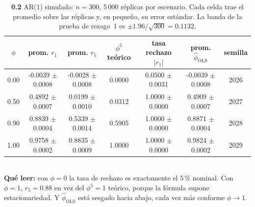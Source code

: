 \begin{table}[htbp]
\centering
\footnotesize
\caption{\textbf{0.2} AR(1) simulado: $n=300$, 5\,000 r\'eplicas por escenario. Cada celda trae el promedio sobre las r\'eplicas y, en peque\~no, su error est\'andar. La banda de la prueba de rezago~1 es $\pm 1.96/\sqrt{300} = 0.1132$.}
\label{tab:p0_tabla_ar1}
\begin{tabular}{ccccccc}
\toprule
\textbf{$\phi$} & \textbf{prom. $r_1$} & \textbf{prom. $r_5$} & \textbf{$\phi^5$ te\'orico} & \textbf{tasa rechazo $|r_1|$} & \textbf{prom. $\hat\phi_{\text{OLS}}$} & \textbf{semilla} \\
\midrule
0.00 & -0.0039 \tiny$\pm$0.0008 & -0.0028 \tiny$\pm$0.0008 & 0.0000 & 0.0500 \tiny$\pm$0.0031 & -0.0039 \tiny$\pm$0.0008 & 2026 \\
0.50 & 0.4892 \tiny$\pm$0.0007 & 0.0199 \tiny$\pm$0.0010 & 0.0312 & 1.0000 \tiny$\pm$0.0000 & 0.4909 \tiny$\pm$0.0007 & 2027 \\
0.90 & 0.8839 \tiny$\pm$0.0004 & 0.5339 \tiny$\pm$0.0014 & 0.5905 & 1.0000 \tiny$\pm$0.0000 & 0.8871 \tiny$\pm$0.0004 & 2028 \\
1.00 & 0.9758 \tiny$\pm$0.0002 & 0.8835 \tiny$\pm$0.0009 & 1.0000 & 1.0000 \tiny$\pm$0.0000 & 0.9824 \tiny$\pm$0.0002 & 2029 \\
\bottomrule
\end{tabular}
\\[0.3em]{\scriptsize \textbf{Qu\'e leer:} con $\phi=0$ la tasa de rechazo es exactamente el 5\,\% nominal. Con $\phi=1$, $r_5=0.88$ en vez del $\phi^5=1$ te\'orico, porque la f\'ormula supone estacionariedad. Y $\hat\phi_{\text{OLS}}$ est\'a sesgado hacia abajo, cada vez m\'as conforme $\phi\to1$.}
\end{table}
